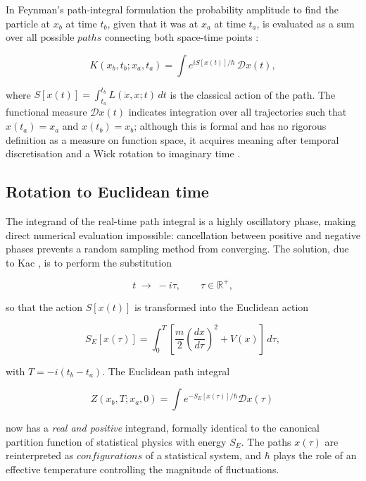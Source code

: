 \documentclass[11pt,a4paper,twoside,pdf]{article}
\numberwithin{equation}{section}
\begin{document}
In Feynman's path-integral formulation the probability amplitude to find the particle at $x_b$ at time $t_b$, given that it was at $x_a$ at time $t_a$, is evaluated as a sum over all possible $paths$ connecting both space-time points \cite{feynman2010quantum}:

\begin{equation}
    K(x_b, t_b; x_a, t_a) = \int  e^{i S[x(t)]/\hbar} \,\mathcal{D} x(t),
    \label{pathint}
\end{equation}

where $S[x(t)] = \int_{t_a}^{t_b} L(\dot{x}, x; t) \, dt$ is the classical action of the path. The functional measure $\mathcal{D}x(t)$ indicates integration over all trajectories such that $x(t_a) = x_a$ and $x(t_b) = x_b$; although this is formal and has no rigorous definition as a measure on function space, it acquires meaning after temporal discretisation and a Wick rotation to imaginary time \cite{galindo1990quantum}. \medskip


\subsection{Rotation to Euclidean time}
\label{Wick}


The integrand of the real-time path integral is a highly oscillatory phase, making direct numerical evaluation impossible: cancellation between positive and negative phases prevents a random sampling method from converging. The solution, due to Kac \cite{galindo1990quantum}, is to perform the substitution

\begin{equation}
    t \;\to\; -i\tau, \qquad \tau \in \mathbb{R}^+,
    \label{wick}
\end{equation}

so that the action $S[x(t)]$ is transformed into the Euclidean action

\begin{equation}
    S_E[x(\tau)] = \int_0^{T} \left[ \frac{m}{2} \left( \frac{dx}{d\tau} \right)^2 + V(x) \right] \, d\tau,
    \label{Seuclid}
\end{equation}

with $T = -i(t_b - t_a)$. The Euclidean path integral

\begin{equation}
    Z(x_b, T; x_a, 0) = \int e^{-S_E[x(\tau)]/\hbar} \mathcal{D} x(\tau) \,
    \label{Zeuclid}
\end{equation}

now has a \textit{real and positive} integrand, formally identical to the canonical partition function of statistical physics with energy $S_E$. The paths $x(\tau)$ are reinterpreted as $configurations$ of a statistical system, and $\hbar$ plays the role of an effective temperature controlling the magnitude of fluctuations.
\end{document}
